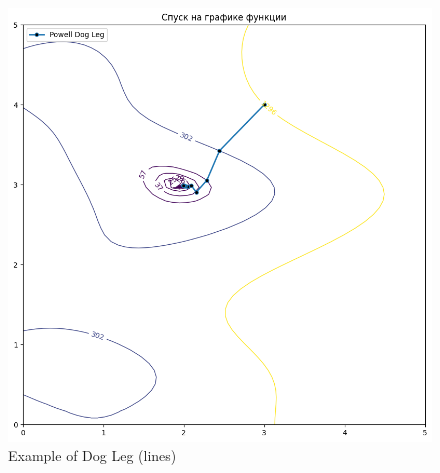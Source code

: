 \documentclass[12pt, a4paper, oneside, final]{article}
\begin{document}
	\begin{figure}[H]
		\centering
		\includegraphics[scale = 0.55]{Image/T1_DOGLEG_LINES_1.png}
		\caption*{Example of Dog Leg (lines)}
	\end{figure}
\end{document}
